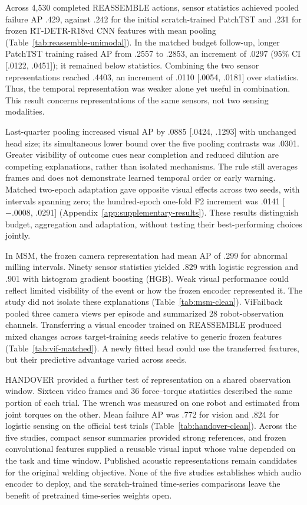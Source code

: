 Across 4,530 completed REASSEMBLE actions, sensor statistics achieved pooled failure AP
.429, against .242 for the initial scratch-trained PatchTST and .231 for frozen
RT-DETR-R18vd CNN features with mean pooling (Table~\ref{tab:reassemble-unimodal}). In
the matched budget follow-up, longer PatchTST training raised AP from .2557 to .2853, an
increment of .0297 (95\% CI [.0122, .0451]); it remained below statistics. Combining the
two sensor representations reached .4403, an increment of .0110 [.0054, .0181] over
statistics. Thus, the temporal representation was weaker alone yet useful in
combination. This result concerns representations of the same sensors, not two sensing
modalities.

Last-quarter pooling increased visual AP by .0885 [.0424, .1293] with unchanged head
size; its simultaneous lower bound over the five pooling contrasts was .0301. Greater
visibility of outcome cues near completion and reduced dilution are competing
explanations, rather than isolated mechanisms. The rule still averages frames and does
not demonstrate learned temporal order or early warning. Matched two-epoch adaptation
gave opposite visual effects across two seeds, with intervals spanning zero; the
hundred-epoch one-fold F2 increment was .0141 [$-.0008$, .0291]
(Appendix~\ref{app:supplementary-results}). These results distinguish budget,
aggregation and adaptation, without testing their best-performing choices jointly.

In MSM, the frozen camera representation had mean AP of .299 for abnormal milling
intervals. Ninety sensor statistics yielded .829 with logistic regression and .901 with
histogram gradient boosting (HGB). Weak visual performance could reflect limited
visibility of the event or how the frozen encoder represented it. The study did not
isolate these explanations (Table~\ref{tab:msm-clean}). ViFailback pooled three camera
views per episode and summarized 28 robot-observation channels. Transferring a visual
encoder trained on REASSEMBLE produced mixed changes across target-training seeds
relative to generic frozen features (Table~\ref{tab:vif-matched}). A newly fitted head
could use the transferred features, but their predictive advantage varied across seeds.

HANDOVER provided a further test of representation on a shared observation window.
Sixteen video frames and 36 force--torque statistics described the same portion of each
trial. The wrench was measured on one robot and estimated from joint torques on the
other. Mean failure AP was .772 for vision and .824 for logistic sensing on the official
test trials (Table~\ref{tab:handover-clean}). Across the five studies, compact sensor
summaries provided strong references, and frozen convolutional features supplied a
reusable visual input whose value depended on the task and time window. Published
acoustic representations remain candidates for the original welding objective. None of
the five studies establishes which audio encoder to deploy, and the scratch-trained
time-series comparisons leave the benefit of pretrained time-series weights open.

